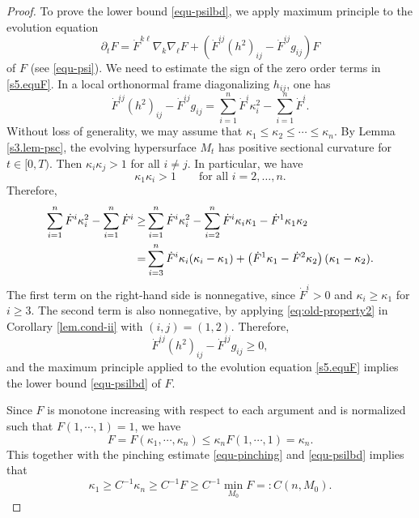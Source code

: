 \documentclass[11pt,reqno]{amsart}
\theoremstyle{remark}
\numberwithin{equation}{section}
\begin{document}
\begin{proof}
To prove the lower bound \eqref{equ-psilbd}, we apply maximum principle to the evolution equation 
\begin{equation}\label{s5.equF}
\partial_t F =  \dot{F}^{k\ell}\nabla_k\nabla_{\ell}F + \left( \dot{F}^{ij}(h^2)_{ij}- \dot{F}^{ij}g_{ij} \right)F
\end{equation}
of $F$ (see \eqref{equ-psi}). We need to estimate the sign of the zero order terms in \eqref{s5.equF}. In a local orthonormal frame diagonalizing $h_{ij}$, one has
\[\dot F^{ij}(h^2)_{ij}-\dot F^{ij}g_{ij}
=\sum_{i=1}^n \dot F^i\kappa_i^2-\sum_{i=1}^n \dot F^i.
\]
Without loss of generality, we may assume that $\kappa_1\le \kappa_2\le \cdots \le \kappa_n$. By Lemma \ref{s3.lem-psc}, the evolving hypersurface $M_t$ has positive sectional curvature for $t\in [0,T)$. Then $\kappa_i\kappa_j>1$ for all $i\neq j$. In particular, we have 
\[
\kappa_1\kappa_i>1 \qquad \text{for all } i=2,\dots,n.
\]
Therefore,
\begin{align*}
		\sum\limits_{i=1}^n \dot{F}^i \kappa_i^2 - \sum\limits_{i=1}^n \dot{F}^i
		\geq &  \sum\limits_{i=1}^n \dot{F}^i\kappa_i^2 - \sum\limits_{i=2}^n \dot{F}^i\kappa_i\kappa_1 - \dot{F}^1\kappa_1\kappa_2 \notag\\
		= & \sum\limits_{i=3}^n \dot{F}^i \kappa_i(\kappa_i-\kappa_1) + \left( \dot{F}^1\kappa_1 - \dot{F}^2\kappa_2 \right)(\kappa_1-\kappa_2).
	\end{align*}
The first term on the right-hand side is nonnegative, since $\dot F^i>0$ and $\kappa_i\ge \kappa_1$ for $i\ge 3$. The second term is also nonnegative, by applying \eqref{eq:old-property2} in Corollary \ref{lem.cond-ii} with $(i,j)=(1,2)$. Therefore, 
\[\dot F^{ij}(h^2)_{ij}-\dot F^{ij}g_{ij}\geq 0,\]
and the maximum principle applied to the evolution equation \eqref{s5.equF} implies the lower bound \eqref{equ-psilbd} of $F$.
    
Since $F$ is monotone increasing with respect to each argument and is normalized such that $F(1,\cdots,1)=1$, we have 
    \[F=F(\kappa_1,\cdots,\kappa_n)\leq \kappa_nF(1,\cdots,1)=\kappa_n.\] 
    This together with the pinching estimate \eqref{equ-pinching} and \eqref{equ-psilbd} implies that
    \begin{equation*}
    	\kappa_1 \geq C^{-1}\kappa_n \geq C^{-1}F \geq C^{-1}\min\limits_{M_0}F =: C(n,M_0).
    \end{equation*}
\end{proof}
\end{document}
